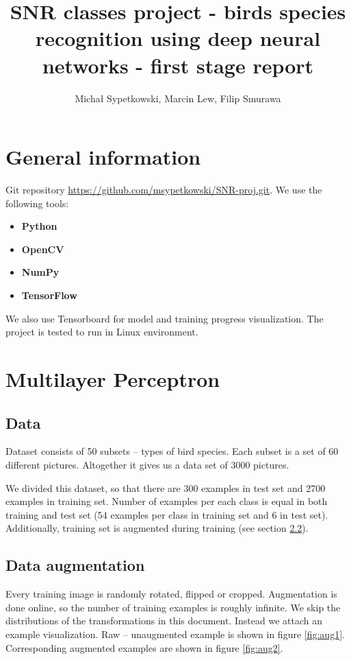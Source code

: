 \documentclass[a4paper]{article}
\begin{document}
\title{SNR classes project - birds species recognition using deep neural networks
- first stage report}

\author{Michał Sypetkowski, Marcin Lew, Filip Smurawa}
\maketitle






\section{General information}
Git repository \url{https://github.com/msypetkowski/SNR-proj.git}.
We use the following tools:
\begin{itemize}
    \item \textbf{Python}\cite{Python}
    \item \textbf{OpenCV}\cite{OpenCV}
    \item \textbf{NumPy}\cite{NumPy}
    \item \textbf{TensorFlow}\cite{TensorFlow}
\end{itemize}
We also use Tensorboard for model and training progress visualization.
The project is tested to run in Linux environment.

\section{Multilayer Perceptron}

\subsection{Data}
Dataset consists of 50 subsets -- types of bird species.
Each subset is a set of 60 different pictures.
Altogether it gives us a data set of 3000 pictures.

We divided this dataset, so that there are 300 examples in test set and
2700 examples in training set.
Number of examples per each class is equal in both training and test set
(54 examples per class in training set and 6 in test set).
Additionally, training set is augmented during training (see section \ref{augmentation}).


\subsection{Data augmentation}
\label{augmentation}
Every training image is randomly rotated, flipped or cropped.
Augmentation is done online, so the number of training examples is
roughly infinite.
We skip the distributions of the transformations in this document.
Instead we attach an example visualization.
Raw -- unaugmented example is shown in figure \ref{fig:aug1}.
Corresponding augmented examples are shown in figure \ref{fig:aug2}.
\end{document}
